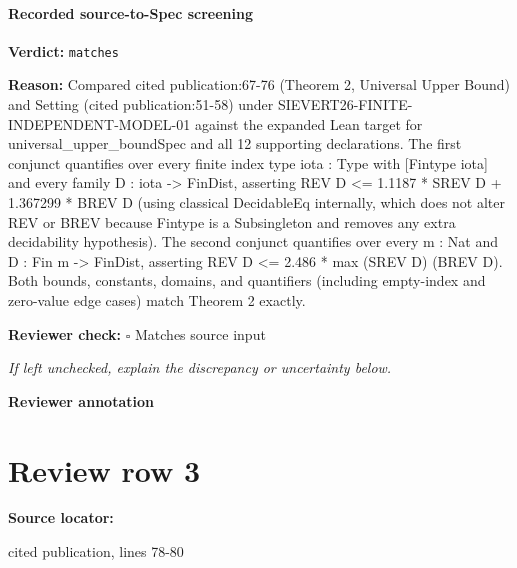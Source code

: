 \documentclass[10pt]{article}
\newcommand{\reviewerbox}{%
  \par\noindent\fbox{\parbox{0.96\linewidth}{\rule{0pt}{0.38in}}}\par
}
\newcommand{\reviewmatch}[1]{%
  \par\noindent\textbf{Reviewer check:} $\square$\; #1\par
  \noindent\emph{If left unchecked, explain the discrepancy or uncertainty below.}\par
}
\begin{document}
\paragraph{Recorded source-to-Spec screening}
\textbf{Verdict:} \texttt{matches}
\\
{\raggedright
\textbf{Reason:} Compared cited publication:\allowbreak{}67-\allowbreak{}76 (Theorem 2, Universal Upper Bound) and Setting (cited publication:\allowbreak{}51-\allowbreak{}58) under SIEVERT26-\allowbreak{}FINITE-\allowbreak{}INDEPENDENT-\allowbreak{}MODEL-\allowbreak{}01 against the expanded Lean target for universal\_\allowbreak{}upper\_\allowbreak{}boundSpec and all 12 supporting declarations.\allowbreak{} The first conjunct quantifies over every finite index type iota :\allowbreak{} Type with [Fintype iota] and every family D :\allowbreak{} iota -\allowbreak{}> FinDist, asserting REV D <= 1.\allowbreak{}1187 * SREV D + 1.\allowbreak{}367299 * BREV D (using classical DecidableEq internally, which does not alter REV or BREV because Fintype is a Subsingleton and removes any extra decidability hypothesis).\allowbreak{} The second conjunct quantifies over every m :\allowbreak{} Nat and D :\allowbreak{} Fin m -\allowbreak{}> FinDist, asserting REV D <= 2.\allowbreak{}486 * max (SREV D) (BREV D).\allowbreak{} Both bounds, constants, domains, and quantifiers (including empty-\allowbreak{}index and zero-\allowbreak{}value edge cases) match Theorem 2 exactly.\allowbreak{}
\par}
\reviewmatch{Matches source input}
\noindent\textbf{Reviewer annotation}\par
\reviewerbox
\clearpage
\hypertarget{source-claim-1868c4adbd598c22}{}
\section*{Review row 3}
\textbf{Source locator:} {\footnotesize\raggedright cited publication, lines 78-\allowbreak{}80\par}
\end{document}

